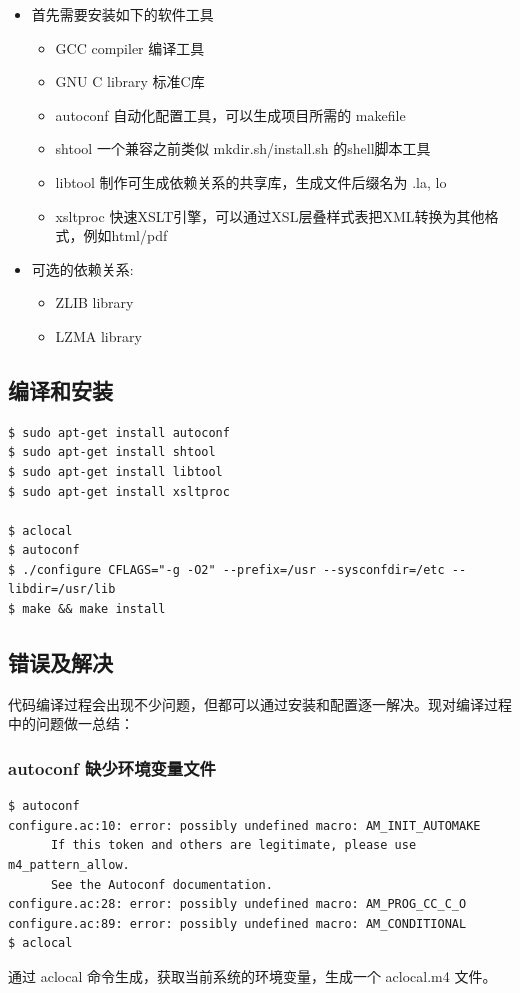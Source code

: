 \begin{itemize}
\item
  首先需要安装如下的软件工具
  \begin{itemize}
  \item
    GCC compiler 编译工具
  \item
    GNU C library 标准C库
  \item
    autoconf 自动化配置工具，可以生成项目所需的 makefile
  \item
    shtool 一个兼容之前类似 mkdir.sh/install.sh 的shell脚本工具
  \item
    libtool 制作可生成依赖关系的共享库，生成文件后缀名为 .la, lo
  \item
    xsltproc
    快速XSLT引擎，可以通过XSL层叠样式表把XML转换为其他格式，例如html/pdf
  \end{itemize}
\item
  可选的依赖关系:
  \begin{itemize}
  \item
    ZLIB library
  \item
    LZMA library
  \end{itemize}
\end{itemize}
\subsection{编译和安装}

{\begin{shaded}\begin{verbatim}
$ sudo apt-get install autoconf 
$ sudo apt-get install shtool 
$ sudo apt-get install libtool
$ sudo apt-get install xsltproc 

$ aclocal
$ autoconf
$ ./configure CFLAGS="-g -O2" --prefix=/usr --sysconfdir=/etc --libdir=/usr/lib
$ make && make install
\end{verbatim}\end{shaded}}
\subsection{错误及解决}

代码编译过程会出现不少问题，但都可以通过安装和配置逐一解决。现对编译过程中的问题做一总结：

\subsubsection{autoconf 缺少环境变量文件}

{\begin{shaded}\begin{verbatim}
$ autoconf 
configure.ac:10: error: possibly undefined macro: AM_INIT_AUTOMAKE
      If this token and others are legitimate, please use m4_pattern_allow.
      See the Autoconf documentation.
configure.ac:28: error: possibly undefined macro: AM_PROG_CC_C_O
configure.ac:89: error: possibly undefined macro: AM_CONDITIONAL
$ aclocal
\end{verbatim}\end{shaded}}
通过 aclocal 命令生成，获取当前系统的环境变量，生成一个 aclocal.m4 文件。

